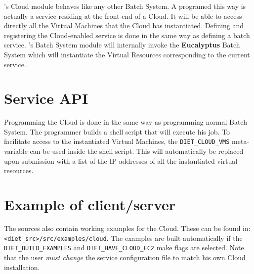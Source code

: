 \diet's Cloud module behaves like any other Batch System. A \sed programed this way
is actually a service residing at the front-end of a Cloud. It will be able to access
directly all the Virtual Machines that the Cloud has instantiated.
Defining and registering the Cloud-enabled \diet service is done in the same way as
defining a batch service. \diet's Batch System module will internally invoke the
\textbf{Eucalyptus} Batch System which will instantiate the Virtual Resources
corresponding to the current service.

\section{Service API}

Programming the \sed Cloud is done in the same way as programming normal Batch System.
The programmer builds a shell script that will execute his job. To facilitate access
to the instantiated Virtual Machines, the \verb!DIET_CLOUD_VMS! meta-variable can
be used inside the shell script. This will automatically be replaced upon submission
with a list of the IP addresses of all the instantiated virtual resources.

\section{Example of client/server}

The \diet sources also contain working examples for the \sed Cloud. These can be
found in: \verb!<diet_src>/src/examples/cloud!. The examples are built automatically
if the \verb!DIET_BUILD_EXAMPLES! and \verb!DIET_HAVE_CLOUD_EC2! make flags are selected.
Note that the user {\it must change} the service configuration file to match his
own Cloud installation.

